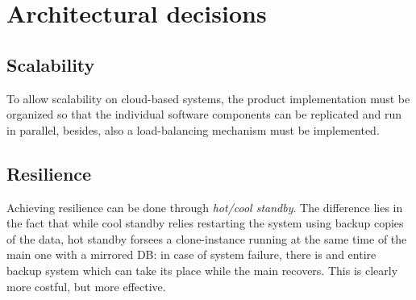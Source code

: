 \section{Architectural decisions}
\begin{center}
\end{center}

\subsection{Scalability}
To allow scalability on cloud-based systems,
the product implementation must be organized so that the individual software components can be replicated and run in parallel,
besides, also a load-balancing mechanism must be implemented.

\subsection{Resilience}
Achieving resilience can be done through \textit{hot/cool standby}.
The difference lies in the fact that while cool standby relies restarting the system using backup copies of the data,
hot standby forsees a clone-instance running at the same time of the main one with a mirrored DB:
in case of system failure,
there is and entire backup system which can take its place while the main recovers.
This is clearly more costful, but more effective.

